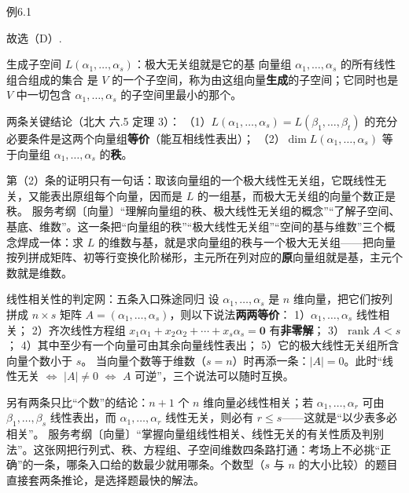 \begin{fcard}{例6.1}

故选（D）.
\end{fcard}


\begin{fdeep}{生成子空间 $L(\alpha_1,\dots,\alpha_s)$：极大无关组就是它的基}
向量组 $\alpha_1,\dots,\alpha_s$ 的所有线性组合组成的集合
是 $V$ 的一个子空间，称为由这组向量\textbf{生成}的子空间；它同时也是 $V$ 中一切包含 $\alpha_1,\dots,\alpha_s$ 的子空间里最小的那个。

两条关键结论（北大 六.5 定理 3）：
（1）$L(\alpha_1,\dots,\alpha_s)=L(\beta_1,\dots,\beta_t)$ 的充分必要条件是这两个向量组\textbf{等价}（能互相线性表出）；
（2）$\dim L(\alpha_1,\dots,\alpha_s)$ 等于向量组 $\alpha_1,\dots,\alpha_s$ 的\textbf{秩}。

第（2）条的证明只有一句话：取该向量组的一个极大线性无关组，它既线性无关，又能表出原组每个向量，因而是 $L$ 的一组基，而极大无关组的向量个数正是秩。
\fbref{}服务考纲〔向量〕“理解向量组的秩、极大线性无关组的概念”“了解子空间、基底、维数”。这一条把“向量组的秩”“极大线性无关组”“空间的基与维数”三个概念焊成一体：求 $L$ 的维数与基，就是求向量组的秩与一个极大无关组——把向量按列拼成矩阵、初等行变换化阶梯形，主元所在列对应的\textbf{原}向量组就是基，主元个数就是维数。
\end{fdeep}

\begin{fdeep}{线性相关性的判定网：五条入口殊途同归}
设 $\alpha_1,\dots,\alpha_s$ 是 $n$ 维向量，把它们按列拼成 $n\times s$ 矩阵 $A=(\alpha_1,\dots,\alpha_s)$，则以下说法\textbf{两两等价}：
1）$\alpha_1,\dots,\alpha_s$ 线性相关；
2）齐次线性方程组 $x_1\alpha_1+x_2\alpha_2+\cdots+x_s\alpha_s=\mathbf{0}$ 有\textbf{非零解}；
3）$\operatorname{rank}A<s$；
4）其中至少有一个向量可由其余向量线性表出；
5）它的极大线性无关组所含向量个数小于 $s$。
当向量个数等于维数（$s=n$）时再添一条：$|A|=0$。此时“线性无关 $\iff$ $|A|\ne0$ $\iff$ $A$ 可逆”，三个说法可以随时互换。

另有两条只比“个数”的结论：$n+1$ 个 $n$ 维向量必线性相关；若 $\alpha_1,\dots,\alpha_r$ 可由 $\beta_1,\dots,\beta_s$ 线性表出，而 $\alpha_1,\dots,\alpha_r$ 线性无关，则必有 $r\le s$——这就是“以少表多必相关”。
\fbref{}服务考纲〔向量〕“掌握向量组线性相关、线性无关的有关性质及判别法”。这张网把行列式、秩、方程组、子空间维数四条路打通：考场上不必挑“正确”的一条，哪条入口给的数最少就用哪条。个数型（$s$ 与 $n$ 的大小比较）的题目直接套两条推论，是选择题最快的解法。
\end{fdeep}

